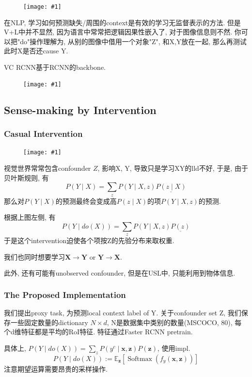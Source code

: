 \documentclass{article}
\newcommand{\cfig}[1]{
    \begin{figure}[htbp]
    \centering
    \texttt{[image: \#1]}
\end{figure}
}
\begin{document}
\cfig{vcrcnn-casual.png}

在NLP, 学习如何预测缺失/周围的context是有效的学习无监督表示的方法. 但是V+L中并不显然, 因为语言中常常把逻辑因果性嵌入了, 对于图像信息则不然. 你可以把"do"操作理解为, 从别的图像中借用一个对象"Z", 和X,Y放在一起, 那么再测试此时X是否还cause Y.

VC RCNN基于RCNN的backbone.

\cfig{vcrcnn-arch.png}

\subsection{Sense-making by Intervention}
\subsubsection{Casual Intervention}
\cfig{vcrcnn-c2.png}

视觉世界常常包含confounder $Z$, 影响X, Y, 导致只是学习XY的lld不好, 于是, 由于贝叶斯规则, 有
\begin{equation}
    P(Y \mid X)=\sum_{z} P(Y \mid X, z) \underline{P(z \mid X)}
\end{equation}
那么对$P(Y \mid X)$的预测最终会变成高$P(z \mid X)$的项$P(Y \mid X, z)$的预测.

根据上图左侧, 有
\begin{equation}
    P(Y \mid d o(X))=\sum_{z} P(Y \mid X, z) \underline{P(z)}
\end{equation}
于是这个intervention迫使各个项按Z的先验分布来取权重.

我们也同时想要学习$\boldsymbol{X} \rightarrow \boldsymbol{Y}$ or $\boldsymbol{Y} \rightarrow \boldsymbol{X}$.

此外, 还有可能有unobserved confounder, 但是在USL中, 只能利用到物体信息.

\subsubsection{The Proposed Implementation}

我们提出proxy task, 为预测local context label of Y. 关于confounder set Z, 我们保存一些固定数量的dictionary $N\times d$, N是数据集中类别的数量(MSCOCO, 80), 每个d维特征都是平均的RoI特征. 特征通过Faster RCNN pretrain.

具体上, $P(Y \mid do(X)) = \sum_{z} P\left(y^{c} \mid \boldsymbol{x}, \boldsymbol{z}\right) P(\boldsymbol{z})$, 使用impl.
\begin{equation}
    P(Y \mid d o(X)):=\mathbb{E}_{\boldsymbol{z}}\left[\operatorname{Softmax}\left(f_{y}(\boldsymbol{x}, \boldsymbol{z})\right)\right]
\end{equation}
注意期望运算需要昂贵的采样操作.
\end{document}

